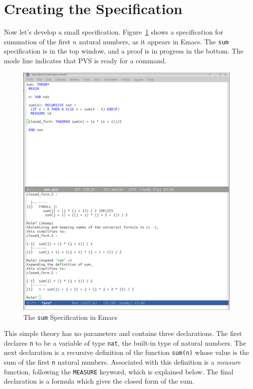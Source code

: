 \section{Creating the Specification}

Now let's develop a small specification.  Figure~\ref{sum-screen} shows
a specification for summation of the first $n$ natural numbers, as it
appears in Emacs.  The \texttt{sum} specification is in the top window,
and a proof is in progress in the bottom.  The mode line indicates that
PVS is ready for a command.

\begin{figure}
\includegraphics[width=\textwidth]{pvs-screen1.png}
\caption{The \texttt{sum} Specification in Emacs}\label{sum-screen}
\end{figure}

This simple theory has no parameters and contains three declarations.  The
first declares \texttt{n} to be a variable of type \texttt{nat}, the
built-in type of natural numbers.  The next declaration is a recursive
definition of the function \texttt{sum(n)} whose value is the sum of the
first \texttt{n} natural numbers.  Associated with this definition is a
\emph{measure} function, following the \texttt{MEASURE} keyword, which is
explained below.  The final declaration is a formula which gives the
closed form of the sum.

